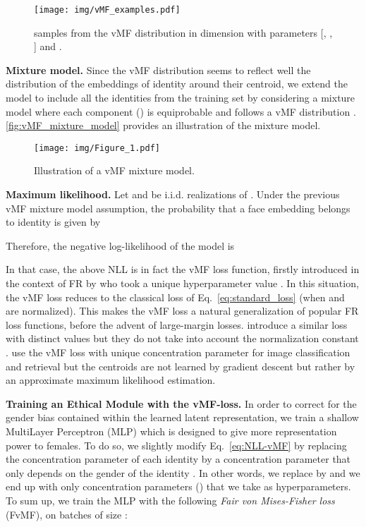 \documentclass[nohyperref]{article}
\theoremstyle{plain}
\theoremstyle{definition}
\theoremstyle{remark}
\begin{document}
\begin{figure*}[ht!]
    \centering
    \texttt{[image: img/vMF\_examples.pdf]}
    \caption{ samples from the vMF distribution in dimension  with parameters  [, , ] and .}
    \label{fig:vMF_kappa_influence}
\end{figure*}

{\bf Mixture model.} Since the vMF distribution seems to reflect well the distribution of the embeddings of  identity around their centroid, we extend the model to include all the  identities from the training set by considering a mixture model where each component  () is equiprobable and follows a vMF distribution . \autoref{fig:vMF_mixture_model} provides an illustration of the mixture model.

\begin{figure}
\vspace{-0.3cm}
    \centering
    \texttt{[image: img/Figure\_1.pdf]}
    \caption{Illustration of a
vMF mixture model.}
    \vspace{-0.5cm}
    \label{fig:vMF_mixture_model}
\end{figure}



{\bf Maximum likelihood.} Let  and  be i.i.d. realizations of . Under the previous vMF mixture model assumption, the probability  that a face embedding  belongs to identity  is given by

Therefore, the negative log-likelihood of the model is
  

In that case, the above NLL is in fact the vMF loss function, firstly introduced in
the context of FR by \cite{vmf_deep_learning}  who took a unique hyperparameter value . In this situation, the vMF loss reduces to the classical loss of Eq.~\ref{eq:standard_loss} (when  and  are normalized). This makes the vMF loss a natural generalization of popular FR loss functions, before the advent of large-margin losses. \cite{adaptive_margin_loss} introduce a similar loss with  distinct  values but they do not take into account the normalization constant . \cite{vmf_classification} use the vMF loss with unique concentration parameter  for image classification and retrieval but the centroids  are not learned by gradient descent but rather by an approximate maximum likelihood estimation. 







{\bf Training an Ethical Module with the vMF-loss.}
In order to correct for the gender bias contained within the learned latent representation, we train a shallow MultiLayer Perceptron (MLP) which is designed to give more representation power to females. To do so, we slightly modify Eq.~\ref{eq:NLL-vMF} by replacing the concentration parameter  of each identity  by a concentration parameter that only depends on the gender  of the identity . In other words, we replace  by  and we end up with only  concentration parameters () that we take as hyperparameters. To sum up, we train the MLP with the following {\it Fair von Mises-Fisher loss} (FvMF), on batches of size :
\end{document}
